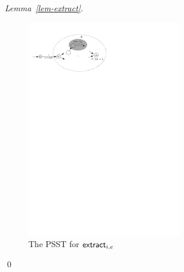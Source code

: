 \begin{proof}[Lemma~\ref{lem-extract}]
\begin{figure}[ht]
\centering
\includegraphics[width = 0.6\textwidth]{psst-extract.pdf}
\caption{The PSST for $\mathsf{extract}_{i,e}$}
\label{fig-psst-extract}
\end{figure}
\qed
\end{proof}


